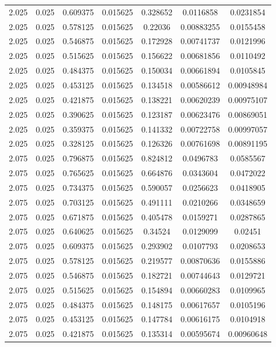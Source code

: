 \begin{flushleft}
\begin{longtable}{ccccccc}
2.025 & 0.025 & 0.609375 & 0.015625 & 0.328652 & 0.0116858 & 0.0231854  \\ 
2.025 & 0.025 & 0.578125 & 0.015625 & 0.22036 & 0.00883255 & 0.0155458  \\ 
2.025 & 0.025 & 0.546875 & 0.015625 & 0.172928 & 0.00741737 & 0.0121996  \\ 
2.025 & 0.025 & 0.515625 & 0.015625 & 0.156622 & 0.00681856 & 0.0110492  \\ 
2.025 & 0.025 & 0.484375 & 0.015625 & 0.150034 & 0.00661894 & 0.0105845  \\ 
2.025 & 0.025 & 0.453125 & 0.015625 & 0.134518 & 0.00586612 & 0.00948984  \\ 
2.025 & 0.025 & 0.421875 & 0.015625 & 0.138221 & 0.00620239 & 0.00975107  \\ 
2.025 & 0.025 & 0.390625 & 0.015625 & 0.123187 & 0.00623476 & 0.00869051  \\ 
2.025 & 0.025 & 0.359375 & 0.015625 & 0.141332 & 0.00722758 & 0.00997057  \\ 
2.025 & 0.025 & 0.328125 & 0.015625 & 0.126326 & 0.00761698 & 0.00891195  \\ 
2.075 & 0.025 & 0.796875 & 0.015625 & 0.824812 & 0.0496783 & 0.0585567  \\ 
2.075 & 0.025 & 0.765625 & 0.015625 & 0.664876 & 0.0343604 & 0.0472022  \\ 
2.075 & 0.025 & 0.734375 & 0.015625 & 0.590057 & 0.0256623 & 0.0418905  \\ 
2.075 & 0.025 & 0.703125 & 0.015625 & 0.491111 & 0.0210266 & 0.0348659  \\ 
2.075 & 0.025 & 0.671875 & 0.015625 & 0.405478 & 0.0159271 & 0.0287865  \\ 
2.075 & 0.025 & 0.640625 & 0.015625 & 0.34524 & 0.0129099 & 0.02451  \\ 
2.075 & 0.025 & 0.609375 & 0.015625 & 0.293902 & 0.0107793 & 0.0208653  \\ 
2.075 & 0.025 & 0.578125 & 0.015625 & 0.219577 & 0.00870636 & 0.0155886  \\ 
2.075 & 0.025 & 0.546875 & 0.015625 & 0.182721 & 0.00744643 & 0.0129721  \\ 
2.075 & 0.025 & 0.515625 & 0.015625 & 0.154894 & 0.00660283 & 0.0109965  \\ 
2.075 & 0.025 & 0.484375 & 0.015625 & 0.148175 & 0.00617657 & 0.0105196  \\ 
2.075 & 0.025 & 0.453125 & 0.015625 & 0.147784 & 0.00616175 & 0.0104918  \\ 
2.075 & 0.025 & 0.421875 & 0.015625 & 0.135314 & 0.00595674 & 0.00960648  \\ 

\end{longtable}
\end{flushleft}
